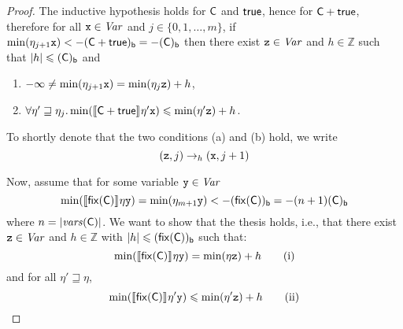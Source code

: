 \begin{proof}
  The inductive hypothesis holds for \(\com\) and \(\tru\), hence for
  \(\com \ndet \tru\), therefore for all \(\var \in \Var\) and
  \(j \in \{0,1, \ldots, m\}\), if
  \(\min(\eta_{j+1} \var) < -\lbound{\com\ndet \tru} = -\lbound{\com}\)
  then there exist \(\var[z] \in \Var\) and \(h \in \mathbb{Z}\) such
  that \(|h| \leq \lbound{\com}\) and
  \begin{enumerate}[label=(\alph*)]
  \item \(-\infty \neq \min(\eta_{j+1} \var) = \min(\eta_j \var[z]) + h\),
  \item \(\forall \eta' \sqsupseteq \eta_j.
    \min(\semi{\com \ndet \tru}\eta'\var) \leq \min(\eta' \var[z]) + h\).
  \end{enumerate}
  To shortly denote that the two conditions (a) and (b) hold, we write
  \[
  (\var[z],j) \to_{h} (\var, j+1)
  \]
  
  Now, assume that for some variable \(\var[y] \in \Var\)
  \[\min(\semi{\fix{\com}} \eta \var[y]) = \min(\eta_{m+1} \var[y]) <
    - \lbound{\fix{\com}} = - (n+1) \lbound{\com}\] where
  \(n=|\mathit{vars}(\com)|\).  We want to show that the thesis holds,
  i.e., that there exist \(\var[z] \in \Var\) and \(h \in \mathbb{Z}\)
  with \(|h| \leq \lbound{\fix{\com}}\) such that:
  \begin{equation}\label{eq:maxendmaxstart}
    \min(\semi{\fix{\com}} \eta \var[y]) = \min(\eta \var[z]) + h
    \tag{i}
  \end{equation}
  and for all \(\eta' \sqsupseteq \eta\),
  \begin{equation}\label{eq:maxmiddlemaxend}
    \min(\semi{\fix{\com}} \eta' \var[y]) \leq \min(\eta' \var[z]) + h
    \tag{ii}
  \end{equation}
  

\end{proof}
